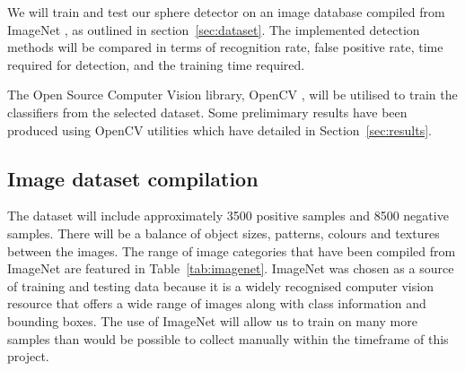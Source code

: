 \documentclass[11pt]{scrartcl}
\begin{document}
{        We will train and test our sphere detector on an image
        database compiled from ImageNet \citep{imagenet_cvpr09}, as outlined in
        section~\ref{sec:dataset}. The implemented detection methods will be
        compared in terms of recognition rate, false positive rate, time
        required for detection, and the training time required.

        The Open Source Computer Vision library, OpenCV \citep{opencv_library},
        will be utilised to train the classifiers from the selected dataset.
        Some prelimimary results have been produced using OpenCV utilities
        which have detailed in Section~\ref{sec:results}.

        \subsection{Image dataset compilation} {
        \label{sec:dataset}

            The dataset will include approximately 3500 positive samples and
            8500 negative samples. There will be a balance of object sizes,
            patterns, colours and textures between the images. The range of
            image categories that have been compiled from ImageNet are
            featured in Table~\ref{tab:imagenet}. ImageNet was chosen as a
            source of training and testing data because it is a widely
            recognised computer vision resource that offers a wide range of
            images along with class information and bounding boxes. The use of
            ImageNet will allow us to train on many more samples than would be
            possible to collect manually within the timeframe of this project.

}}
\end{document}
